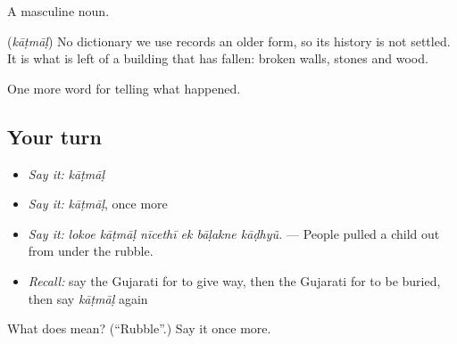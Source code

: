A masculine noun.

\begin{cousinweb}
\textbf{} (\emph{kāṭmāḷ}) No dictionary we use records an older form, so its history is not settled. It is what is left of a building that has fallen: broken walls, stones and wood.
\end{cousinweb}

\begin{grammarlens}[title={What you've built}]
One more word for telling what happened.
\end{grammarlens}

\subsection*{Your turn}
\begin{itemize}
\raggedright
  \item \emph{Say it:} \emph{kāṭmāḷ}
  \item \emph{Say it:} \emph{kāṭmāḷ}, once more
  \item \emph{Say it:} \emph{lokoe kāṭmāḷ nīcethī ek bāḷakne kāḍhyũ.} — People pulled a child out from under the rubble.
  \item \emph{Recall:} say the Gujarati for to give way, then the Gujarati for to be buried, then say \emph{kāṭmāḷ} again
\end{itemize}

\begin{tcolorbox}[breakable,colback=teal!4,colframe=teal!35!black,title={Before you move on}]
What does  mean? (\textquotedblleft{}Rubble\textquotedblright{}.) Say it once more.
\end{tcolorbox}
